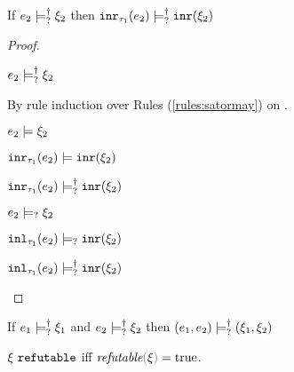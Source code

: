\begin{lemma}
  \label{lem:satormay-inr}
  If $e_2 \models_{?}^{\dag} \xi_2$ then $\mathtt{inr}_{\tau_1}({e_2}) \models_{?}^{\dag} \mathtt{inr}(\xi_2)$
\end{lemma}
\begin{proof}
  \begin{pfsteps*}
  \item $e_2 \models_{?}^{\dag} \xi_2$  
  \end{pfsteps*}
  By rule induction over Rules (\ref{rules:satormay}) on .
  \begin{byCases}

  \item[\text{(\ref{rule:CSMSSat})}]
    \begin{pfsteps*}
    \item $e_2 \models \xi_2$  
    \item $\mathtt{inr}_{\tau_1}({e_2}) \models \mathtt{inr}(\xi_2)$  
    \item $\mathtt{inr}_{\tau_1}({e_2}) \models_{?}^{\dag} \mathtt{inr}(\xi_2)$ 
    \end{pfsteps*}

  \item[\text{(\ref{rule:CSMSMay})}]
    \begin{pfsteps*}
    \item $e_2 \models_{?} \xi_2$  
    \item $\mathtt{inl}_{\tau_1}({e_2}) \models_{?} \mathtt{inr}(\xi_2)$  
    \item $\mathtt{inl}_{\tau_1}({e_2}) \models_{?}^{\dag} \mathtt{inr}(\xi_2)$ 
    \end{pfsteps*}
  \end{byCases}
  \resetpfcounter
\end{proof}

\begin{lemma}
  \label{lem:satormay-pair}
  If $e_1 \models_{?}^{\dag} \xi_1$ and $e_2 \models_{?}^{\dag} \xi_2$ then $(e_1 , e_2) \models_{?}^{\dag} (\xi_1 , \xi_2)$
\end{lemma}

\begin{lemma}
  \label{lem:sound-complete-xi-refutable}
  $\xi ~\mathtt{refutable}$ iff $\frefutable{\xi} = \true$.
\end{lemma}

